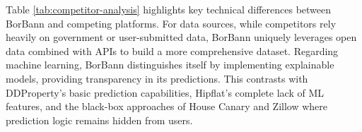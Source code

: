 \begin{table}[htbp]
\centering
\renewcommand{\arraystretch}{1.3}
\caption{Comprehensive Technical Comparison}
\label{tab:competitor-analysis}
\end{table}

Table \ref{tab:competitor-analysis} highlights key technical differences between BorBann and competing platforms.
 For data sources, while competitors rely heavily on government or user-submitted data, BorBann uniquely leverages open data combined with
  APIs to build a more comprehensive dataset. Regarding machine learning, BorBann distinguishes itself by implementing explainable models,
   providing transparency in its predictions. This contrasts with DDProperty's basic prediction capabilities, Hipflat's complete lack of ML features,
    and the black-box approaches of House Canary and Zillow where prediction logic remains hidden from users.


